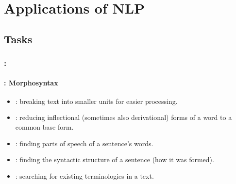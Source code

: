 \documentclass[xcolor=table]{beamer}
\begin{document}
\section{Applications of NLP}

\begin{frame}
	\frametitle{\insertshortsubtitle}
	\framesubtitle{\insertsection}
	
	
\end{frame}

\subsection{Tasks}

\begin{frame}
	\frametitle{\insertshortsubtitle: \insertsection}
	\framesubtitle{\insertsubsection: Morphosyntax}

	\begin{itemize}
		\item {}: breaking text into smaller units for easier processing.
		\item {}: reducing inflectional (sometimes also derivational) forms of a word to a common base form.
		\item {}: finding parts of speech of a sentence's words.
		\item {}: finding the syntactic structure of a sentence (how it was formed).
		\item {}: searching for existing terminologies in a text.
	\end{itemize}

\end{frame}
\end{document}
